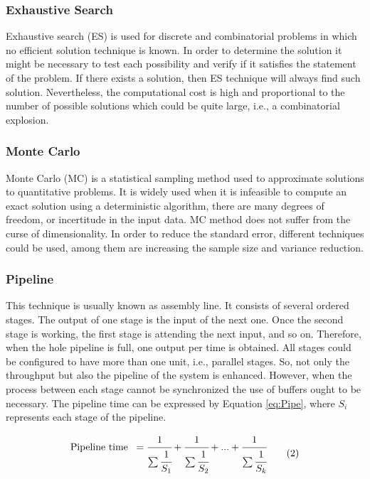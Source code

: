 \documentclass[11pt]{article} %
\begin{document}
\subsubsection{Exhaustive Search}
\label{sssec:exh}

Exhaustive search (ES) is used for discrete and combinatorial problems in which no efficient solution technique is known. In order to determine the solution it might be necessary to test each possibility and verify if it satisfies the statement of the problem. If there exists a solution, then ES technique will always find such solution. Nevertheless, the computational cost is high and proportional to the number of possible solutions which could be quite large, i.e., a combinatorial explosion. 

\subsubsection{Monte Carlo}
\label{sssec:mc}

Monte Carlo (MC) is a statistical sampling method used to approximate solutions to quantitative problems. It is widely used when it is infeasible to compute an exact solution using a deterministic algorithm, there are many degrees of freedom, or incertitude in the input data. MC method does not suffer from the curse of dimensionality. In order to reduce the standard error, different techniques  could be used, among them are increasing the sample size and variance reduction.

\subsubsection{Pipeline}
\label{ssec:pipe}

This technique is usually known as assembly line. It consists of several ordered stages. The output of one stage is the input of the next one. Once the second stage is working, the first stage is attending the next input, and so on. Therefore, when the hole pipeline is full, one output per time is obtained. All stages could be configured to have more than one unit, i.e., parallel stages. So, not only the throughput but also the pipeline of the system is enhanced. However, when the process between each stage cannot be synchronized the use of buffers ought to be necessary. The pipeline time can be expressed by Equation  \eqref{eq:Pipe}, where $ S_i $ represents each stage of the pipeline.

\vspace{-0.05cm}
\begin{equation*}  \label{eq:Pipe}
\vspace{-0.05cm}
\begin{aligned}
& {\text{Pipeline time }} \:  = \cfrac{1}{ \sum \cfrac{1}{S_1} } + \cfrac{1}{ \sum \cfrac{1}{S_2} } + ... + \cfrac{1}{ \sum \cfrac{1}{S_k} }  \\
\end{aligned}
\tag{2}
\end{equation*}
\end{document}
